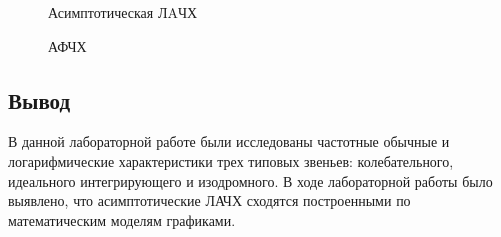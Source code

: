 \documentclass[a4paper, 12pt]{article}
\begin{document}
\newpage

\begin{figure}[h!]
	\caption{Асимптотическая ЛAЧХ}
	\label{3alachh}
\end{figure}
\begin{figure}[h!]
	\caption{АФЧХ}
	\label{3afchh}
\end{figure}

\newpage

\begin{center}
	\section*{Вывод}
\end{center}\par
В данной лабораторной работе были исследованы частотные обычные и логарифмические характеристики трех типовых звеньев: колебательного, идеального интегрирующего и изодромного. В ходе лабораторной работы было выявлено, что асимптотические ЛАЧХ сходятся построенными по математическим моделям графиками.
\end{document}
